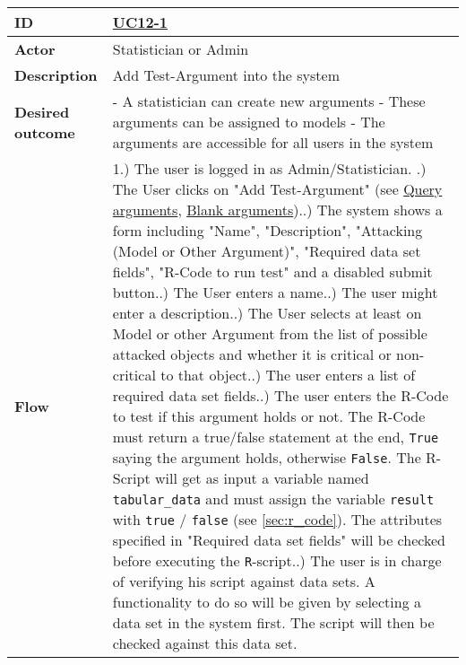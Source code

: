 \begin{table}[h]
	\centering
	\tiny{
		\begin{tabular}{|p{1.3cm} p{11.5cm}|}
			\hline
				\textbf{ID} & 
					\href{https://trello.com/c/2V6Cl65u}{UC12-1}\\
				
				\hline
				\textbf{Actor} & Statistician or Admin \\
				\hline
				\textbf{Description} & 
					Add Test-Argument into the system\\
				\hline
				\textbf{Desired outcome} & 
					- A statistician can create new arguments \newline
					- These arguments can be assigned to models \newline
					- The arguments are accessible for all users in the system
			\\
			\hline
				\textbf{Flow} & 
					1.) The user is logged in as Admin/Statistician.  \newline
					2.) The User clicks on "Add Test-Argument" (see \href{https://trello.com/c/OwM2Z7wt}{Query arguments}, \href{https://trello.com/c/Rg6GPnNE/39-uc12-5-add-attacks-between-arguments}{Blank arguments}).\newline
					3.) The system shows a form including "Name", "Description", "Attacking (Model or Other Argument)", "Required data set fields", "R-Code to run test" and a disabled submit button.\newline
					4.) The User enters a name.\newline
					5.) The user might enter a description.\newline
					6.) The User selects at least on Model or other Argument from the list of possible attacked objects and whether it is critical or non-critical to that object.\newline
					7.) The user enters a list of required data set fields.\newline
					8.) The user enters the R-Code to test if this argument holds or not. The R-Code must return a true/false statement at the end, \texttt{True} saying the argument holds, otherwise \texttt{False}. The R-Script will get as input a variable named \texttt{tabular\_data}  and must assign the variable \texttt{result} with \texttt{true} / \texttt{false} (see \autoref{sec:r_code}). The attributes specified in "Required data set fields" will be checked before executing the \texttt{R}-script.\newline
					9.) The user is in charge of verifying his script against data sets. A functionality to do so will be given by selecting a data set in the system first. The script will then be checked against this data set.\newline

\end{tabular}}
\end{table}
